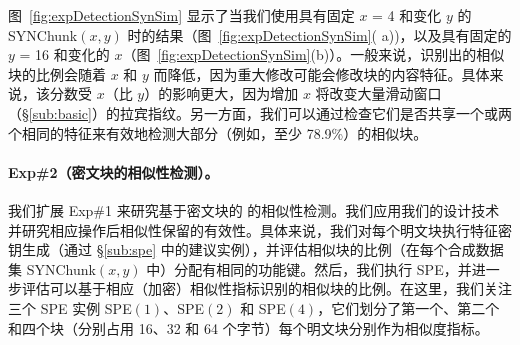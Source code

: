 图~\ref{fig:expDetectionSynSim} 显示了当我们使用具有固定 $x$ = 4 和变化 $y$ 的 SYNChunk$(x, y)$ 时的结果（图~\ref{fig:expDetectionSynSim}( a))，以及具有固定的 $y$ = 16 和变化的 $x$（图~\ref{fig:expDetectionSynSim}(b)）。一般来说，识别出的相似块的比例会随着 $x$ 和 $y$ 而降低，因为重大修改可能会修改块的内容特征。具体来说，该分数受 $x$（比 $y$）的影响更大，因为增加 $x$ 将改变大量滑动窗口（\S\ref{sub:basic}）的拉宾指纹。另一方面，我们可以通过检查它们是否共享一个或两个相同的特征来有效地检测大部分（例如，至少 78.9\%）的相似块。



\paragraph{Exp\#2（密文块的相似性检测）。}
我们扩展 Exp\#1 来研究基于密文块的 \sysnameF 的相似性检测。我们应用我们的设计技术并研究相应操作后相似性保留的有效性。具体来说，我们对每个明文块执行特征密钥生成（通过 \S\ref{sub:spe} 中的建议实例），并评估相似块的比例（在每个合成数据集 SYNChunk$(x, y)$ 中）分配有相同的功能键。然后，我们执行 SPE，并进一步评估可以基于相应（加密）相似性指标识别的相似块的比例。在这里，我们关注三个 SPE 实例 SPE$(1)$、SPE$(2)$ 和 SPE$(4)$，它们划分了第一个、第二个和四个块（分别占用 16、32 和 64 个字节）每个明文块分别作为相似度指标。

